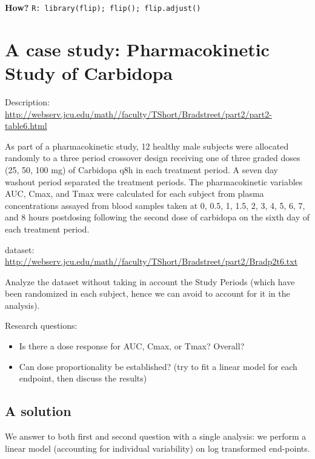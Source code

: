 \documentclass[
]{article}
\providecommand{\tightlist}{%
  \setlength{\itemsep}{0pt}\setlength{\parskip}{0pt}}
\begin{document}
\textbf{How?} \texttt{R:\ library(flip);\ flip();\ flip.adjust()}

\hypertarget{a-case-study-pharmacokinetic-study-of-carbidopa}{%
\section{A case study: Pharmacokinetic Study of
Carbidopa}\label{a-case-study-pharmacokinetic-study-of-carbidopa}}

Description:\\
\url{http://webserv.jcu.edu/math//faculty/TShort/Bradstreet/part2/part2-table6.html}

As part of a pharmacokinetic study, 12 healthy male subjects were
allocated randomly to a three period crossover design receiving one of
three graded doses (25, 50, 100 mg) of Carbidopa q8h in each treatment
period. A seven day washout period separated the treatment periods. The
pharmacokinetic variables AUC, Cmax, and Tmax were calculated for each
subject from plasma concentrations assayed from blood samples taken at
0, 0.5, 1, 1.5, 2, 3, 4, 5, 6, 7, and 8 hours postdosing following the
second dose of carbidopa on the sixth day of each treatment period.

dataset:\\
\url{http://webserv.jcu.edu/math//faculty/TShort/Bradstreet/part2/Bradp2t6.txt}

Analyze the dataset without taking in account the Study Periods (which
have been randomized in each subject, hence we can avoid to account for
it in the analysis).

Research questions:

\begin{itemize}
\tightlist
\item
  Is there a dose response for AUC, Cmax, or Tmax? Overall?
\item
  Can dose proportionality be established? (try to fit a linear model
  for each endpoint, then discuss the results)
\end{itemize}

\hypertarget{a-solution}{%
\subsection{A solution}\label{a-solution}}

We answer to both first and second question with a single analysis: we
perform a linear model (accounting for individual variability) on log
transformed end-points.
\end{document}
